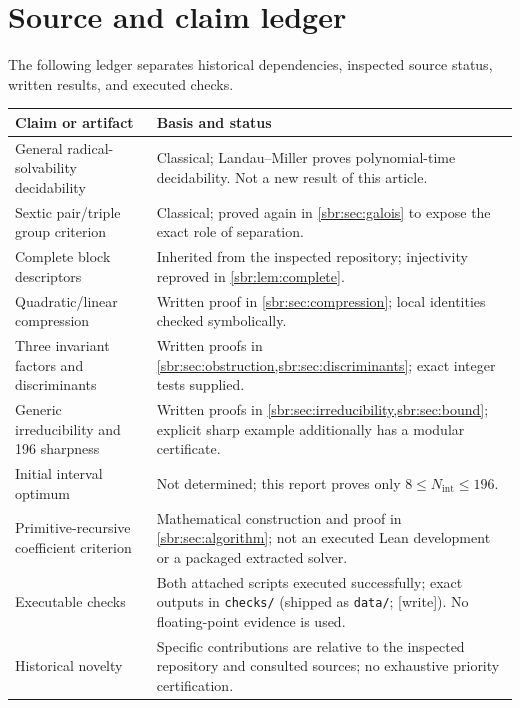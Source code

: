 \documentclass[11pt,letterpaper]{article}
\numberwithin{equation}{section}
\theoremstyle{definition}
\theoremstyle{remark}
\newcommand{\src}[1]{\texttt{\nolinkurl{#1}}}
\begin{document}
\section{Source and claim ledger}
\label{sbr:app:ledger}

The following ledger separates historical dependencies, inspected source
status, written results, and executed checks.

\begin{longtable}{@{}p{}p{}@{}}
\toprule
Claim or artifact & Basis and status\\
\midrule
\endhead
General radical-solvability decidability & Classical; Landau--Miller proves
polynomial-time decidability. Not a new result of this article.\\[5pt]
Sextic pair/triple group criterion & Classical; proved again in
\cref{sbr:sec:galois} to expose the exact role of separation.\\[5pt]
Complete block descriptors & Inherited from the inspected repository;
injectivity reproved in \cref{sbr:lem:complete}.\\[5pt]
Quadratic/linear compression & Written proof in \cref{sbr:sec:compression};
local identities checked symbolically.\\[5pt]
Three invariant factors and discriminants & Written proofs in
\cref{sbr:sec:obstruction,sbr:sec:discriminants}; exact integer tests supplied.\\[5pt]
Generic irreducibility and 196 sharpness & Written proofs in
\cref{sbr:sec:irreducibility,sbr:sec:bound}; explicit sharp example additionally
has a modular certificate.\\[5pt]
Initial interval optimum & Not determined; this report proves only
$8\le N_{\mathrm{int}}\le196$.\\[5pt]
Primitive-recursive coefficient criterion & Mathematical construction and
proof in \cref{sbr:sec:algorithm}; not an executed Lean development or a
packaged extracted solver.\\[5pt]
Executable checks & Both attached scripts executed successfully; exact
outputs in \src{checks/} (shipped as \src{data/}; [write]). No
floating-point evidence is used.\\[5pt]
Historical novelty & Specific contributions are relative to the inspected
repository and consulted sources; no exhaustive priority certification.\\
\bottomrule
\end{longtable}
\end{document}
